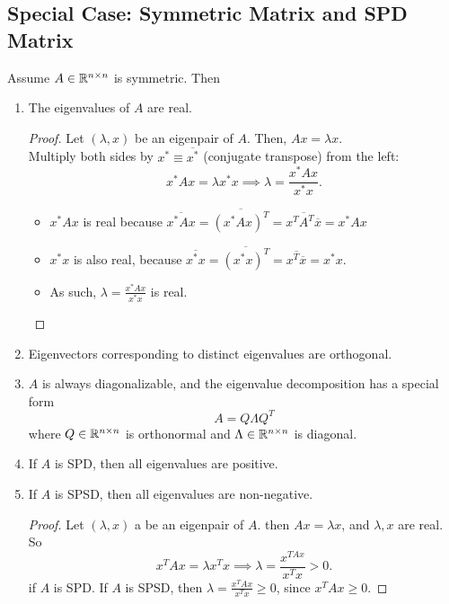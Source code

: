 \documentclass[../main/main.tex]{subfiles}
\begin{document}
\subsection{Special Case: Symmetric Matrix and SPD Matrix}
Assume $A\in \mathbb{R}^{n\times n}$ is symmetric. Then
\begin{enumerate}
	\item The eigenvalues of $A$ are real.
		\begin{proof}
			Let $\left( \lambda,x \right) $ be an eigenpair of $A$. Then, $Ax=\lambda x$.\\Multiply both sides by $x^{*}\equiv \overline{x^{*}}$ (conjugate transpose) from the left: \[
			x^{*}Ax=\lambda x^{*}x\implies \lambda= \frac{x^*Ax}{x^*x}
		.\] 
		\begin{itemize}
			\item $x^*Ax$ is real because $\overline{x^*Ax}=\overline{\left( x^*Ax \right)^{T} }=\overline{x^{T}A^{T}\overline{x}}=x^*Ax$
			\item $x^*x$ is also real, because $\overline{x^{*}x}=\overline{\left( x^*x \right) ^{T}}=\overline{x^{T}\overline{x}}=x^*x$.
			\item As such, $\lambda= \frac{x^*Ax}{x^*x}$ is real.
\end{itemize}
		\end{proof}
	\item Eigenvectors corresponding to distinct eigenvalues are orthogonal.
	\item $A$ is always diagonalizable, and the eigenvalue decomposition has a special form \[
	A=Q\Lambda Q^{T}
	\] where $Q\in \mathbb{R}^{n\times n}$ is orthonormal and $\Lambda\in \mathbb{R}^{n\times n}$ is diagonal.
\item If $A$ is SPD, then all eigenvalues are positive. 
\item If $A$ is SPSD, then all eigenvalues are non-negative.
	\begin{proof}
		Let $\left( \lambda,x \right) $ a be an eigenpair of $A$. then $Ax=\lambda x$, and $\lambda,x$ are real. So \[
		x^{T}Ax=\lambda x^{T}x\implies \lambda=\frac{x^{T Ax}}{x^{T}x}>0
		.\] if $A$ is SPD. If  $A$ is SPSD, then $\lambda=\frac{x^{T}Ax}{x^{T}x}\ge 0$, since $x^{T}Ax\ge 0$.
	\end{proof}
\end{enumerate}
\end{document}
